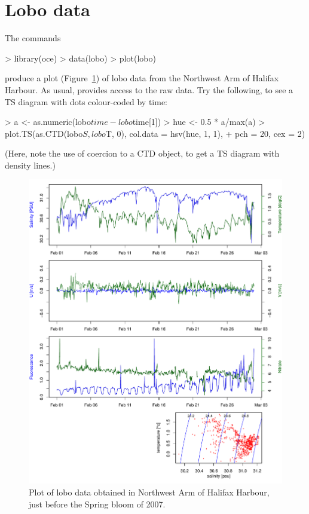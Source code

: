 \documentclass{article}
\begin{document}
\section{Lobo data}
The commands
\begin{Schunk}
\begin{Sinput}
> library(oce)
> data(lobo)
> plot(lobo)
\end{Sinput}
\end{Schunk}
produce a plot (Figure~\ref{fig:lobo}) of lobo data from the Northwest Arm of Halifax Harbour.
As usual, \verb@oce@ provides access to the raw data.  Try the following, to see a TS
diagram with dots colour-coded by time:
\begin{Schunk}
\begin{Sinput}
> a <- as.numeric(lobo$time - lobo$time[1])
> hue <- 0.5 * a/max(a)
> plot.TS(as.CTD(lobo$S, lobo$T, 0), col.data = hsv(hue, 1, 1), 
+     pch = 20, cex = 2)
\end{Sinput}
\end{Schunk}
(Here, note the use of coercion to a CTD object, to get a TS diagram with density lines.)
\begin{figure}
\begin{center}
\includegraphics{oce-lobofig}
\end{center}
\caption{Plot of lobo data obtained in Northwest Arm of Halifax Harbour, just
before the Spring bloom of 2007.}
\label{fig:lobo}
\end{figure}
\end{document}
